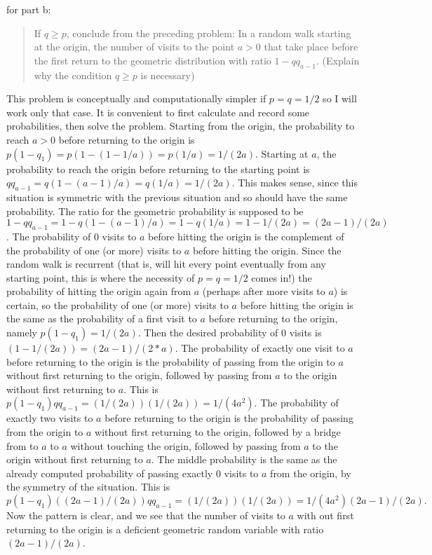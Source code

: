 \begin{solution} 

for part b:
\begin{quote}
  If $q \ge p$, conclude from the preceding problem:  In a random
  walk starting at the origin, the number of visits to the point
  $a > 0$ that take place before the first return to the
  geometric distribution with ratio $1 - q q_{a-1}$.  
  (Explain why the condition $q \ge p$ is necessary)
\end{quote}

This problem is conceptually and computationally simpler if $p
= q = 1/2$ so I will work only that case.   
It is convenient to first calculate and record 
some probabilities, then solve the problem.
Starting from the origin, the probability to reach $a>0$ before
returning to the origin is $p (1-q_1) = p ( 1 - (1 - 1/a)) =
p (1/a) = 1/(2a)$.
Starting at $a$, the probability to reach the origin before
returning to the starting point is $q q_{a-1} = q ( 1 - (a-1)/a)
= q (1/a) = 1/(2a)$.  This makes sense, since this situation is
symmetric with the previous situation and so should have the
same probability.
The ratio for the geometric probability is supposed to be $1 -
q q_{a-1} = 1 - q (1 - (a-1)/a) = 1 - q (1/a) = 1 - 1/(2a) =
(2a-1)/(2a)$.    
The probability of $0$ visits to $a$ before hitting the
origin is the complement of the probability of one (or more)
visits to $a$ before hitting the origin.  Since the random
walk is recurrent (that is, will hit every point eventually
from any starting point, this is where the necessity of $p = q
=1/2$ comes in!) the probability of hitting the origin again
from $a$ (perhaps after more visits to $a$) is certain, so the
probability of one (or more) visits to $a$ before hitting the
origin is the same as the probability of a first visit to $a$
before returning to the origin,
namely $p (1-q_1) = 1/(2 a)$.  Then the desired probability of $0$
visits is $(1 - 1/(2a)) = (2a-1)/(2*a)$.
The probability of exactly one visit to $a$ before returning to
the origin is the
probability of passing from the origin to $a$ without first
returning to the origin, followed by passing from $a$ to the
origin without first returning to $a$.  This is
$p (1-q_1) q q_{a-1} = ( 1/(2 a) ) ( 1/(2 a) ) = 1/(4 a^2)$.
The probability of exactly two visits to $a$ before
returning to the origin is the
probability of passing from the origin to $a$ without first
returning to the origin, followed by a bridge from to $a$ to $a$
without touching the origin, followed by passing from $a$ to the
origin without first returning to $a$.  The middle probability
is the same as the already computed probability of passing
exactly $0$ visits to $a$ from the origin, by the symmetry of the
situation.  This is
\[
  p (1-q_1) ( (2 a-1)/(2 a) )   q q_{a-1} = ( 1/(2 a) ) (
  1/(2 a) ) = 1/(4 a^2) (2 a-1)/(2 a).
\]
Now the pattern is clear, and we see that the number of visits
to $a$ with out first returning to the origin is a deficient geometric
random variable with ratio $(2a-1)/(2a)$.  


\end{solution}
